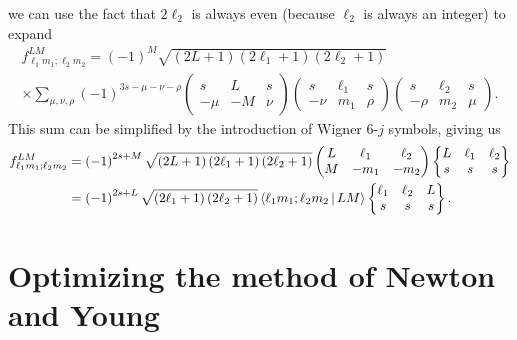 \documentclass[nofootinbib,twocolumn]{revtex4-1}
\newcommand{\p}[1]{\left(#1\right)} %
\newcommand{\bk}{\Braket} %
\begin{document}
we can use the fact that $2\ell_2$ is always even (because $\ell_2$ is always an integer) to expand
\begin{multline}
  f_{\ell_1 m_1;\ell_2 m_2}^{LM}
  = \p{-1}^M \sqrt{\p{2L+1}\p{2\ell_1+1}\p{2\ell_2+1}} \\
  \times \sum_{\mu,\nu,\rho} \p{-1}^{3s-\mu-\nu-\rho}
  \begin{pmatrix}
    s & L & s \\
    -\mu & -M & \nu
  \end{pmatrix}
  \begin{pmatrix}
    s & \ell_1 & s \\
    -\nu & m_1 & \rho
  \end{pmatrix}
  \begin{pmatrix}
    s & \ell_2 & s \\
    -\rho & m_2 & \mu
  \end{pmatrix}.
\end{multline}
This sum can be simplified by the introduction of Wigner 6-$j$ symbols, giving us
\begin{align}
  f_{\ell_1 m_1;\ell_2 m_2}^{LM}
  &= \p{-1}^{2s+M} \sqrt{\p{2L+1}\p{2\ell_1+1}\p{2\ell_2+1}}
  \begin{pmatrix}
    L & \ell_1 & \ell_2 \\
    M & -m_1 & -m_2
  \end{pmatrix}
  \begin{Bmatrix}
    L & \ell_1 & \ell_2 \\
    s & s & s
  \end{Bmatrix} \\
  &= \p{-1}^{2s+L} \sqrt{\p{2\ell_1+1}\p{2\ell_2+1}}
  \bk{\ell_1 m_1; \ell_2 m_2| LM}
  \begin{Bmatrix}
    \ell_1 & \ell_2 & L \\
    s & s & s
  \end{Bmatrix}.
\end{align}

\section{Optimizing the method of Newton and Young}
\label{sec:angle_search}
\end{document}
